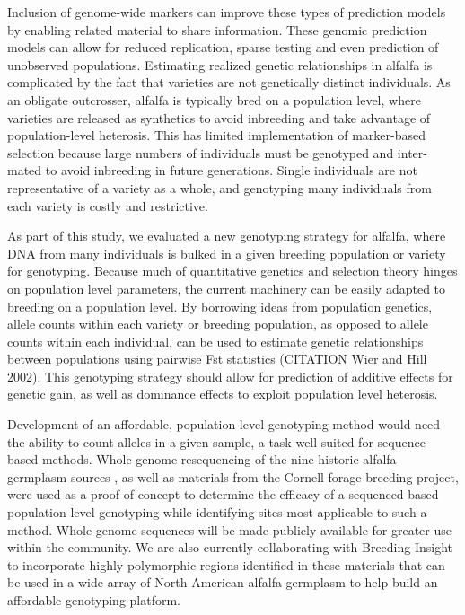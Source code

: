 \documentclass[12pt, letterpaper]{article}
\begin{document}
Inclusion of genome-wide markers can improve these types of prediction models by enabling related material to share information. These genomic prediction models can allow for reduced replication, sparse testing and even prediction of unobserved populations. Estimating realized genetic relationships in alfalfa is complicated by the fact that varieties are not genetically distinct individuals. As an obligate outcrosser, alfalfa is typically bred on a population level, where varieties are released as synthetics to avoid inbreeding and take advantage of population-level heterosis. This has limited implementation of marker-based selection because large numbers of individuals must be genotyped and inter-mated to avoid inbreeding in future generations. Single individuals are not representative of a variety as a whole, and genotyping many individuals from each variety is costly and restrictive. 

As part of this study, we evaluated a new genotyping strategy for alfalfa, where DNA from many individuals is bulked in a given breeding population or variety for genotyping. Because much of quantitative genetics and selection theory hinges on population level parameters, the current machinery can be easily adapted to breeding on a population level. By borrowing ideas from population genetics, allele counts within each variety or breeding population, as opposed to allele counts within each individual, can be used to estimate genetic relationships between populations using pairwise Fst statistics (CITATION Wier and Hill 2002). This genotyping strategy should allow for prediction of additive effects for genetic gain, as well as dominance effects to exploit population level heterosis. 

Development of an affordable, population-level genotyping method would need the ability to count alleles in a given sample, a task well suited for sequence-based methods. Whole-genome resequencing of the nine historic alfalfa germplasm sources \parencite{barnes1977, segovia2004}, as well as materials from the Cornell forage breeding project, were used as a proof of concept to determine the efficacy of a sequenced-based population-level genotyping while identifying sites most applicable to such a method. Whole-genome sequences will be made publicly available for greater use within the community. We are also currently collaborating with Breeding Insight to incorporate highly polymorphic regions identified in these materials that can be used in a wide array of North American alfalfa germplasm to help build an affordable genotyping platform. 
\end{document}

